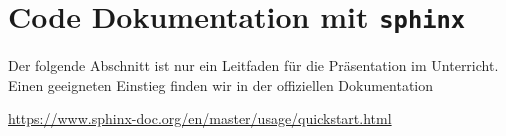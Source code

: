 \newpage
\section{Code Dokumentation mit	\texttt{sphinx}}

Der folgende Abschnitt ist nur ein Leitfaden für die Präsentation im Unterricht. Einen geeigneten Einstieg finden wir in der offiziellen Dokumentation
\begin{center}
	\url{https://www.sphinx-doc.org/en/master/usage/quickstart.html}
\end{center}



%
%
%
%
%
%
